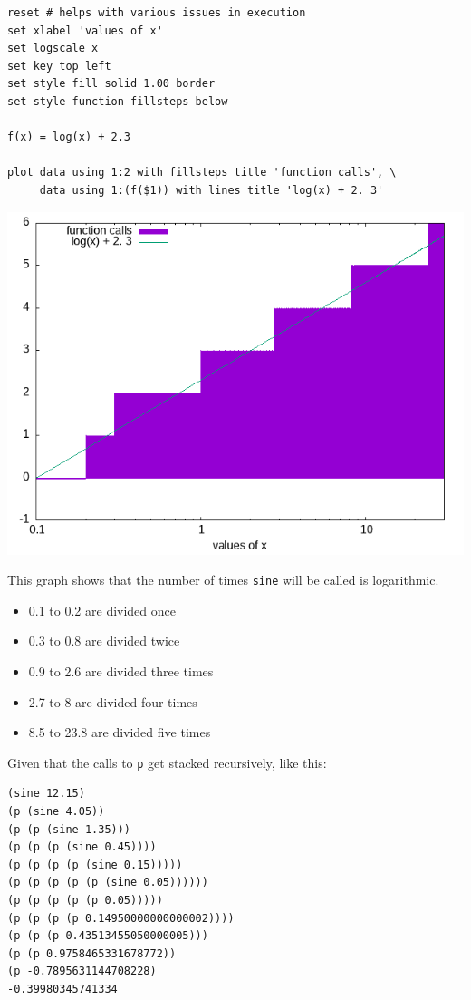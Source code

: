 \documentclass[final,fleqn,titlepage]{article}
\begin{document}
\begin{verbatim}
reset # helps with various issues in execution
set xlabel 'values of x'
set logscale x
set key top left
set style fill solid 1.00 border
set style function fillsteps below

f(x) = log(x) + 2.3

plot data using 1:2 with fillsteps title 'function calls', \
     data using 1:(f($1)) with lines title 'log(x) + 2. 3'
\end{verbatim}

\begin{center}
\includegraphics[width=.9\linewidth]{fig/1-15-step.png}
\end{center}

This graph shows that the number of times \texttt{sine} will be called is logarithmic.
\begin{itemize}
\item 0.1 to 0.2 are divided once
\item 0.3 to 0.8 are divided twice
\item 0.9 to 2.6 are divided three times
\item 2.7 to 8 are divided four times
\item 8.5 to 23.8 are divided five times
\end{itemize}

Given that the calls to \texttt{p} get stacked recursively, like this:
\begin{verbatim}
(sine 12.15)
(p (sine 4.05))
(p (p (sine 1.35)))
(p (p (p (sine 0.45))))
(p (p (p (p (sine 0.15)))))
(p (p (p (p (p (sine 0.05))))))
(p (p (p (p (p 0.05)))))
(p (p (p (p 0.14950000000000002))))
(p (p (p 0.43513455050000005)))
(p (p 0.9758465331678772))
(p -0.7895631144708228)
-0.39980345741334
\end{verbatim}
\end{document}

